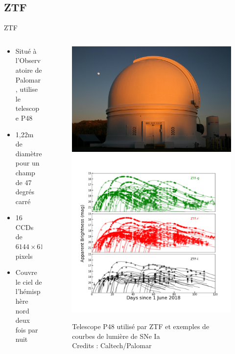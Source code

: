 \documentclass{beamer}
\newcommand{\credits}[1]{\tiny Credits : #1}
\begin{document}
\subsection{ZTF}
\begin{frame}{ZTF}
\begin{columns}
\begin{column}{.5\textwidth}
	\begin{itemize}
		\item Situé à l'Observatoire de Palomar, utilise le telescope P48
		\item 1,22m de diamètre pour un champ de 47 degrés carré
		\item 16 CCDs de $6144 \times 6160$ pixels
		\item Couvre le ciel de l'hémisphère nord deux fois par nuit
	\end{itemize}
\end{column}

\begin{column}{.5\textwidth}
	\begin{figure}
		\centering
		\includegraphics[width=.5\textwidth]{figures/ZTF_dome.jpg}
		\includegraphics[width=.6\textwidth]{figures/ZTF_lightcurves.png}
		\caption{Telescope P48 utilisé par ZTF et exemples de courbes de lumière de SNe Ia \\ \credits{Caltech/Palomar}}
	\end{figure}
\end{column}
\end{columns}
\end{frame}
\end{document}
